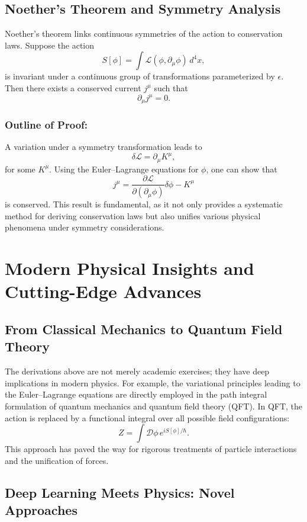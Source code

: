\documentclass[11pt,a4paper]{article}
\begin{document}
\subsection{Noether’s Theorem and Symmetry Analysis}

Noether’s theorem links continuous symmetries of the action to conservation laws. Suppose the action
\[
S[\phi] = \int \mathcal{L}(\phi, \partial_\mu \phi)\, d^4x,
\]
is invariant under a continuous group of transformations parameterized by \(\epsilon\). Then there exists a conserved current \(j^\mu\) such that
\[
\partial_\mu j^\mu = 0.
\]

\subsubsection*{Outline of Proof:}
A variation under a symmetry transformation leads to
\[
\delta \mathcal{L} = \partial_\mu K^\mu,
\]
for some \(K^\mu\). Using the Euler--Lagrange equations for \(\phi\), one can show that
\[
j^\mu = \frac{\partial \mathcal{L}}{\partial (\partial_\mu \phi)} \delta \phi - K^\mu
\]
is conserved. This result is fundamental, as it not only provides a systematic method for deriving conservation laws but also unifies various physical phenomena under symmetry considerations.

\section{Modern Physical Insights and Cutting-Edge Advances}

\subsection{From Classical Mechanics to Quantum Field Theory}

The derivations above are not merely academic exercises; they have deep implications in modern physics. For example, the variational principles leading to the Euler--Lagrange equations are directly employed in the path integral formulation of quantum mechanics and quantum field theory (QFT). In QFT, the action is replaced by a functional integral over all possible field configurations:
\[
Z = \int \mathcal{D}\phi \, e^{i S[\phi]/\hbar}.
\]
This approach has paved the way for rigorous treatments of particle interactions and the unification of forces.

\subsection{Deep Learning Meets Physics: Novel Approaches}
\end{document}
